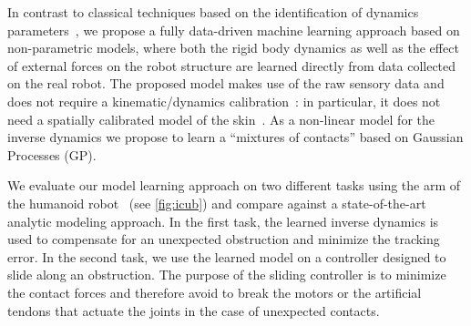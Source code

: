 %
In contrast to classical techniques based on the identification of dynamics parameters~\cite{Yamane2011calibration,Ogawa2014,Traversaro2013}, we propose a fully data-driven machine learning approach based on non-parametric models, where both the rigid body dynamics as well as the effect of external forces on the robot structure are learned directly from data collected on the real robot.
The proposed model makes use of the raw sensory data and does not require a kinematic/dynamics calibration~\cite{Yamane2011calibration,Ogawa2014,Traversaro2013}: in particular, it does not need a spatially calibrated model of the skin~\cite{DelPrete2011}.
As a non-linear model for the inverse dynamics we propose to learn a ``mixtures of contacts'' based on Gaussian Processes (GP).
%
%
%

%

We evaluate our model learning approach on two different tasks using the arm of the \robot{} humanoid robot~\cite{Natale2013} (see \fig\ref{fig:icub}) and compare against a state-of-the-art analytic modeling approach.
%
% 
In the first task, the learned inverse dynamics is used to compensate for an unexpected obstruction and minimize the tracking error.
In the second task, we use the learned model on a controller designed to slide along an obstruction. 
The purpose of the sliding controller is to minimize the contact forces and therefore avoid to break the motors or the artificial tendons that actuate the joints in the case of unexpected contacts.


